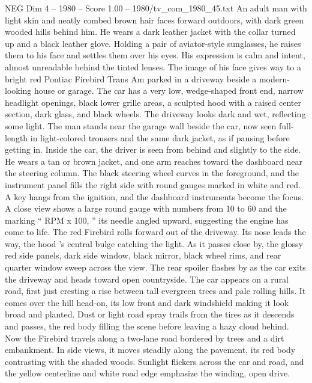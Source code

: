 \begin{textsample}{NEG Dim 4 – 1980 – Score 1.00 – 1980/tv\_com\_1980\_45.txt}  \label{ex:f4_neg_057}
An adult man with light skin and neatly combed brown hair faces forward outdoors, with dark green wooded hills behind him.
He wears a dark leather jacket with the collar turned up and a black leather glove.
Holding a pair of aviator-style sunglasses, he raises them to his face and settles them over his eyes.
His expression is calm and intent, almost unreadable behind the tinted lenses.
The image of his face gives way to a bright red Pontiac Firebird Trans Am parked in a driveway beside a modern-looking house or garage.
The car has a very low, wedge-shaped front end, narrow headlight openings, black lower grille areas, a sculpted hood with a raised center section, dark glass, and black wheels.
The driveway looks dark and wet, reflecting some light.
The man stands near the garage wall beside the car, now seen full-length in light-colored trousers and the same dark jacket, as if pausing before getting in.
Inside the car, the driver is seen from behind and slightly to the side.
He wears a tan or brown jacket, and one arm reaches toward the dashboard near the steering column.
The black steering wheel curves in the foreground, and the instrument panel fills the right side with round gauges marked in white and red.
A key hangs from the ignition, and the dashboard instruments become the focus.
A close view shows a large round gauge with numbers from 10 to 60 and the marking “ RPM x 100, ” its needle angled upward, suggesting the engine has come to life.
The red Firebird rolls forward out of the driveway.
Its nose leads the way, the hood ’s central bulge catching the light.
As it passes close by, the glossy red side panels, dark side window, black mirror, black wheel rims, and rear quarter window sweep across the view.
The rear spoiler flashes by as the car exits the driveway and heads toward open countryside.
The car appears on a rural road, first just cresting a rise between tall evergreen trees and pale rolling hills.
It comes over the hill head-on, its low front and dark windshield making it look broad and planted.
Dust or light road spray trails from the tires as it descends and passes, the red body filling the scene before leaving a hazy cloud behind.
Now the Firebird travels along a two-lane road bordered by trees and a dirt embankment.
In side views, it moves steadily along the pavement, its red body contrasting with the shaded woods.
Sunlight flickers across the car and road, and the yellow centerline and white road edge emphasize the winding, open drive.

\end{textsample}
